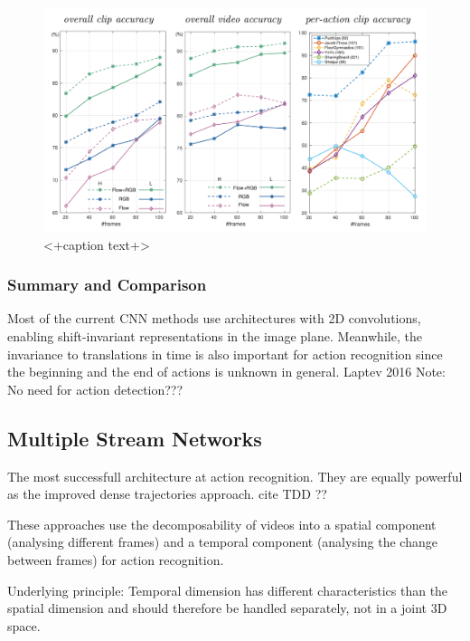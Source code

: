 \begin{figure}[H]
    \centering
    \includegraphics[width=\textwidth]{img_deep/longterm_systematical}
    \caption{<+caption text+>}
    \label{fig:<+label+>}
\end{figure}

\subsubsection{Summary and Comparison}
Most of the current CNN methods use architectures with 2D convolutions, enabling shift-invariant representations in the image plane. Meanwhile, the invariance to translations in time is also important for action recognition since the beginning and the end of actions is unknown in general. Laptev 2016
Note: No need for action detection???

\newpage
\subsection{Multiple Stream Networks}
The most successfull architecture at action recognition. They are equally powerful as the improved dense trajectories approach. cite TDD ??

These approaches use the decomposability of videos into a spatial component (analysing different frames) and a temporal component (analysing the change between frames) for action recognition.

Underlying principle: Temporal dimension has different characteristics than the spatial dimension and should therefore be handled separately, not in a joint 3D space.

